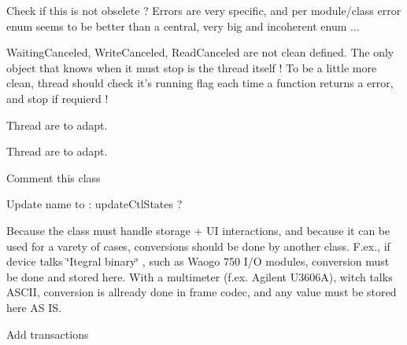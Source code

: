 
\begin{DoxyRefList}
\item[\label{todo__todo000077}%
\hypertarget{todo__todo000077}{}%
Member \hyperlink{mdt_error_8h_a0f1a2f7579a33e6de2fe8a1cbb5bbbb5}{mdt\-\_\-error\-\_\-t} ]Check if this is not obselete ? Errors are very specific, and per module/class error enum seems to be better than a central, very big and incoherent enum ...  
\item[\label{todo__todo000020}%
\hypertarget{todo__todo000020}{}%
Class \hyperlink{classmdt_abstract_port}{mdt\-Abstract\-Port} ]Waiting\-Canceled, Write\-Canceled, Read\-Canceled are not clean defined. The only object that knows when it must stop is the thread itself ! To be a little more clean, thread should check it's running flag each time a function returns a error, and stop if requierd !  
\item[\label{todo__todo000021}%
\hypertarget{todo__todo000021}{}%
Member \hyperlink{classmdt_abstract_port_a54b7bfb725c91b2c292a39275b877207}{mdt\-Abstract\-Port\-:\-:flush\-In\-Request\-Pending} ()]Thread are to adapt.  
\item[\label{todo__todo000022}%
\hypertarget{todo__todo000022}{}%
Member \hyperlink{classmdt_abstract_port_a2cc79d9288bebafaa183753dcf0807f3}{mdt\-Abstract\-Port\-:\-:flush\-Out\-Request\-Pending} ()]Thread are to adapt.  
\item[\label{todo__todo000044}%
\hypertarget{todo__todo000044}{}%
Class \hyperlink{classmdt_abstract_serial_port}{mdt\-Abstract\-Serial\-Port} ]Comment this class  
\item[\label{todo__todo000045}%
\hypertarget{todo__todo000045}{}%
Member \hyperlink{classmdt_abstract_serial_port_aaeacd26b220ab0f8c521cef74edfafdd}{mdt\-Abstract\-Serial\-Port\-:\-:get\-Ctl\-States} ()=0]Update name to \-: update\-Ctl\-States ?  
\item[\label{todo__todo000074}%
\hypertarget{todo__todo000074}{}%
Class \hyperlink{classmdt_analog_io}{mdt\-Analog\-Io} ]Because the class must handle storage + U\-I interactions, and because it can be used for a varety of cases, conversions should be done by another class. F.\-ex., if device talks \char`\"{}\-Itegral binary\char`\"{} , such as Waogo 750 I/\-O modules, conversion must be done and stored here. With a multimeter (f.\-ex. Agilent U3606\-A), witch talks A\-S\-C\-I\-I, conversion is allready done in frame codec, and any value must be stored here A\-S I\-S.  
\item[\label{todo__todo000047}%
\hypertarget{todo__todo000047}{}%
Member \hyperlink{classmdt_cl_direct_link_aa7a155c3bf99b91e2d9cff85e93f332b}{mdt\-Cl\-Direct\-Link\-:\-:add\-Links\-By\-Unit\-Connector} (const Q\-Variant unit\-Connector\-Id\-S, const Q\-Variant unit\-Connector\-Id\-E, \hyperlink{classmdt_cl_path_graph}{mdt\-Cl\-Path\-Graph} $\ast$graph)]Add transactions  

\end{DoxyRefList}
